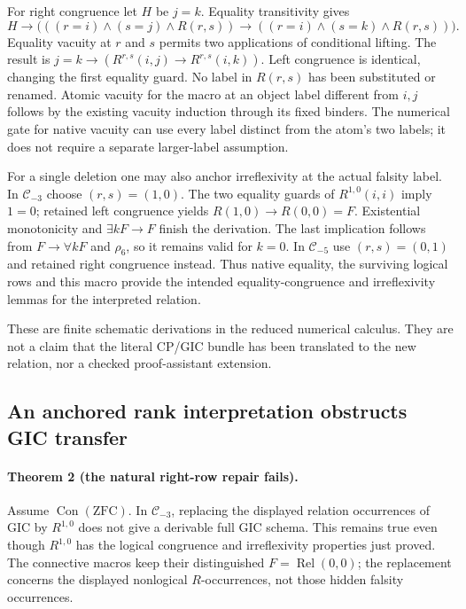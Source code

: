 For right congruence let $H$ be $j=k$. Equality transitivity gives
\[
 H\to\bigl(((r=i)\land(s=j)\land R(r,s))\to
              ((r=i)\land(s=k)\land R(r,s))\bigr).
\]
Equality vacuity at $r$ and $s$ permits two applications of conditional
lifting. The result is
$j=k\to(R^{r,s}(i,j)\to R^{r,s}(i,k))$.
Left congruence is identical, changing the first equality guard.
No label in $R(r,s)$ has been substituted or renamed. Atomic vacuity
for the macro at an object label different from $i,j$ follows by the
existing vacuity induction through its fixed binders. The numerical gate
for native vacuity can use every label distinct from the atom's two
labels; it does not require a separate larger-label assumption.

For a single deletion one may also anchor irreflexivity at the actual
falsity label. In $\mathcal C_{-3}$ choose $(r,s)=(1,0)$. The two equality
guards of $R^{1,0}(i,i)$ imply $1=0$; retained left congruence yields
$R(1,0)\to R(0,0)=F$. Existential monotonicity and
$\exists kF\to F$ finish the derivation.
The last implication follows from $F\to\forall kF$ and $\rho_6$,
so it remains valid for $k=0$. In $\mathcal C_{-5}$ use $(r,s)=(0,1)$
and retained right congruence instead. Thus native equality, the surviving
logical rows and this macro provide the intended equality-congruence and
irreflexivity lemmas for the interpreted relation.

These are finite schematic derivations in the reduced numerical calculus.
They are not a claim that the literal CP/GIC bundle has been translated
to the new relation, nor a checked proof-assistant extension.

\subsection{An anchored rank interpretation obstructs GIC transfer}

\paragraph{Theorem 2 (the natural right-row repair fails).}
Assume $\operatorname{Con}(\mathrm{ZFC})$. In $\mathcal C_{-3}$,
replacing the displayed relation occurrences of GIC by $R^{1,0}$ does not give a
derivable full GIC schema. This remains true even though $R^{1,0}$ has
the logical congruence and irreflexivity properties just proved. The
connective macros keep their distinguished $F=\operatorname{Rel}(0,0)$;
the replacement concerns the displayed nonlogical $R$-occurrences, not
those hidden falsity occurrences.


